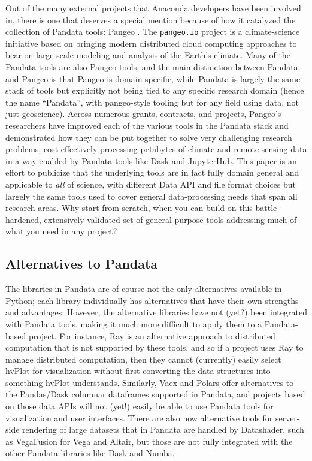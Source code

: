 Out of the many external projects that Anaconda developers have been involved in, there is one that deserves a special mention because of how it catalyzed the collection of Pandata tools: Pangeo \cite{odaka:tthpc20}. The \texttt{pangeo.io} project is a climate-science initiative based on bringing modern distributed cloud computing approaches to bear on large-scale modeling and analysis of the Earth's climate. Many of the Pandata tools are also Pangeo tools, and the main distinction between Pandata and Pangeo is that Pangeo is domain specific, while Pandata is largely the same stack of tools but explicitly not being tied to any specific research domain (hence the name ``Pandata'', with pangeo-style tooling but for any field using data, not just geoscience). Across numerous grants, contracts, and projects, Pangeo's researchers have improved each of the various tools in the Pandata stack and demonstrated how they can be put together to solve very challenging research problems, cost-effectively processing petabytes of climate and remote sensing data in a way enabled by Pandata tools like Dask and JupyterHub. This paper is an effort to publicize that the underlying tools are in fact fully domain general and applicable to \emph{all} of science, with different Data API and file format choices but largely the same tools used to cover general data-processing needs that span all research areas. Why start from scratch, when you can build on this battle-hardened, extensively validated set of general-purpose tools addressing much of what you need in any project?

\subsection{Alternatives to Pandata}

The libraries in Pandata are of course not the only alternatives available in Python; each library individually has alternatives that have their own strengths and advantages. However, the alternative libraries have not (yet?) been integrated with Pandata tools, making it much more difficult to apply them to a Pandata-based project. For instance, Ray \cite{moritz:arxiv18} is an alternative approach to distributed computation that is not supported by these tools, and so if a project uses Ray to manage distributed computation, then they cannot (currently) easily select hvPlot for visualization without first converting the data structures into something hvPlot understands. Similarly, Vaex \cite{breddels:aaa18} and Polars \cite{ritche:polars} offer alternatives to the Pandas/Dask columnar dataframes supported in Pandata, and projects based on those data APIs will not (yet!) easily be able to use Pandata tools for visualization and user interfaces. There are also now alternative tools for server-side rendering of large datasets that in Pandata are handled by Datashader, such as VegaFusion for Vega and Altair, but those are not fully integrated with the other Pandata libraries like Dask and Numba.

